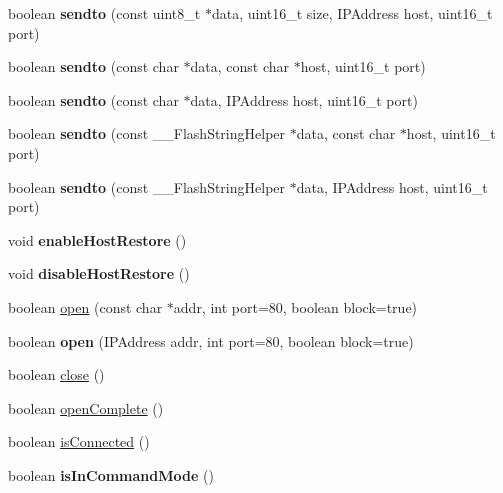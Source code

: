 \begin{DoxyCompactItemize}
\item 
\hypertarget{class_wi_fly_adce62360f898970feda79c0532e6c8cb}{
boolean {\bfseries sendto} (const uint8\-\_\-t $\ast$data, uint16\-\_\-t size, \-I\-P\-Address host, uint16\-\_\-t port)}
\label{class_wi_fly_adce62360f898970feda79c0532e6c8cb}

\item 
\hypertarget{class_wi_fly_ac2f152bece511499607f85be35ae3f81}{
boolean {\bfseries sendto} (const char $\ast$data, const char $\ast$host, uint16\-\_\-t port)}
\label{class_wi_fly_ac2f152bece511499607f85be35ae3f81}

\item 
\hypertarget{class_wi_fly_a76b6ca17daa3d521cfa6ba4354ea72cc}{
boolean {\bfseries sendto} (const char $\ast$data, \-I\-P\-Address host, uint16\-\_\-t port)}
\label{class_wi_fly_a76b6ca17daa3d521cfa6ba4354ea72cc}

\item 
\hypertarget{class_wi_fly_ac89ffe7c1c66f4cfd7a8074ec9ec115a}{
boolean {\bfseries sendto} (const \-\_\-\-\_\-\-Flash\-String\-Helper $\ast$data, const char $\ast$host, uint16\-\_\-t port)}
\label{class_wi_fly_ac89ffe7c1c66f4cfd7a8074ec9ec115a}

\item 
\hypertarget{class_wi_fly_a1909f3a97604f7e47c4fa113d74d2ba6}{
boolean {\bfseries sendto} (const \-\_\-\-\_\-\-Flash\-String\-Helper $\ast$data, \-I\-P\-Address host, uint16\-\_\-t port)}
\label{class_wi_fly_a1909f3a97604f7e47c4fa113d74d2ba6}

\item 
\hypertarget{class_wi_fly_a56df06031856225028de1c843db042e1}{
void {\bfseries enable\-Host\-Restore} ()}
\label{class_wi_fly_a56df06031856225028de1c843db042e1}

\item 
\hypertarget{class_wi_fly_afa9e95b9bbd6820de142adc8abc16170}{
void {\bfseries disable\-Host\-Restore} ()}
\label{class_wi_fly_afa9e95b9bbd6820de142adc8abc16170}

\item 
boolean \hyperlink{class_wi_fly_a06969fe6f0008d0fc9e8b927e3cd2077}{open} (const char $\ast$addr, int port=80, boolean block=true)
\item 
\hypertarget{class_wi_fly_aa77120d8605228294003978775f6f7fa}{
boolean {\bfseries open} (\-I\-P\-Address addr, int port=80, boolean block=true)}
\label{class_wi_fly_aa77120d8605228294003978775f6f7fa}

\item 
boolean \hyperlink{class_wi_fly_adf4138137065fd78de83a18825f47795}{close} ()
\item 
boolean \hyperlink{class_wi_fly_a457a8823a24ce0199787249971c58090}{open\-Complete} ()
\item 
boolean \hyperlink{class_wi_fly_ab5581857d54ac66c1bab4fdff59b1d74}{is\-Connected} ()
\item 
\hypertarget{class_wi_fly_a4d4ff69bfb01f2c9f300ef50ce6d2b67}{
boolean {\bfseries is\-In\-Command\-Mode} ()}
\label{class_wi_fly_a4d4ff69bfb01f2c9f300ef50ce6d2b67}


\end{DoxyCompactItemize}
